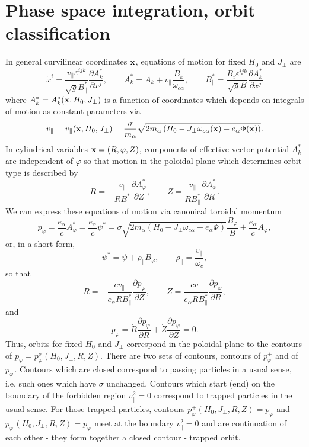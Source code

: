 \documentclass[preprint,prb,aps]{revtex4-1}
\newcommand{\be}[1]{\begin{equation} \label{#1}}
\newcommand{\ee}{\end{equation}}
\newcommand{\difp}[2]{\frac{\partial #1}{\partial #2}}
\newcommand{\bx}{{\bf x}}
\begin{document}
\section{Phase space integration, orbit classification}
\label{sec:class}

\noindent
In general curvilinear coordinates $\bx$, equations of motion for fixed $H_0$ and 
$J_\perp$ are
\be{eqm}
\dot x^i = \frac{v_\parallel\varepsilon^{ijk}}{\sqrt{g}B_\parallel^\ast}
\difp{A_k^\ast}{x^j},
\qquad
A_k^\ast=A_k + v_\parallel\frac{B_k}{\omega_{c\alpha}},
\qquad
B_\parallel^\ast = \frac{B_i\varepsilon^{ijk}}{\sqrt{g}B}\difp{A_k^\ast}{x^j}
\ee
where $A_k^\ast=A_k^\ast(\bx,H_0,J_\perp)$ is a function of coordinates which
depends on integrals of motion as constant parameters via
\be{vparmod}
v_\parallel=v_\parallel(\bx,H_0,J_\perp)=\frac{\sigma}{m_\alpha}
\sqrt{2m_\alpha\left(H_0-J_\perp\omega_{c\alpha}(\bx)-e_\alpha\Phi(\bx)\right)}.
\ee
In cylindrical variables $\bx=(R,\varphi,Z)$, components of effective vector-potential
$A_k^\ast$ are independent of $\varphi$ so that motion in the poloidal plane which
determines orbit type is described by
\be{polplane}
\dot R = - \frac{v_\parallel}{R B_\parallel^\ast}\difp{A_\varphi^\ast}{Z},
\qquad
\dot Z = \frac{v_\parallel}{R B_\parallel^\ast}\difp{A_\varphi^\ast}{R}.
\ee
We can express these equations of motion via canonical toroidal momentum
\be{tormom}
p_\varphi=\frac{e_\alpha}{c}A_\varphi^\ast=
\frac{e_\alpha}{c}\psi^\ast=
\sigma \sqrt{2m_\alpha\left(H_0-J_\perp\omega_{c\alpha}-e_\alpha\Phi\right)}
\frac{B_\varphi}{B}
+\frac{e_\alpha}{c}A_\varphi,
\ee
or, in a short form,
\be{psiast_gc}
\psi^\ast=\psi+\rho_\parallel B_\varphi,
\qquad
\rho_\parallel = \frac{v_\parallel}{\omega_c},
\ee
so that
\be{polpl_pphi}
\dot R = - \frac{cv_\parallel}{e_\alpha R B_\parallel^\ast}\difp{p_\varphi}{Z},
\qquad
\dot Z = \frac{c v_\parallel}{e_\alpha R B_\parallel^\ast}\difp{p_\varphi}{R},
\ee
and
\be{conservepphi}
\dot p_\varphi = \dot R\difp{p_\varphi}{R}+\dot Z\difp{p_\varphi}{Z}=0.
\ee
Thus, orbits for fixed $H_0$ and $J_\perp$ correspond in the poloidal plane 
to the contours of $p_\varphi=p_\varphi^\sigma(H_0,J_\perp,R,Z)$. There are two
sets of contours, contours of $p_\varphi^+$ and of $p_\varphi^-$.
Contours which are closed correspond to passing particles in a usual sense, i.e. 
such ones which have $\sigma$ unchanged. Contours which start (end) on the boundary
of the forbidden region $v_\parallel^2=0$ correspond to trapped particles in the 
usual sense. For those trapped particles, contours 
$p_\varphi^+(H_0,J_\perp,R,Z)=p_\varphi$ and $p_\varphi^-(H_0,J_\perp,R,Z)=p_\varphi$
meet at the boundary $v_\parallel^2=0$ and are continuation of each other - they 
form together a closed contour - trapped orbit.
\end{document}
